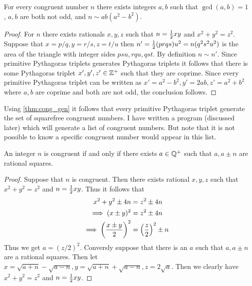 \begin{theorem}\label{thm:cong_gen}
  For every congruent number $n$ there exists integers $a,b$ such that $\gcd(a,b) = 1$, $a,b$ are both not odd, and $n \sim ab(a^2-b^2)$. 
\end{theorem}
\begin{proof}
  For $n$ there exists rationals $x,y,z$ such that $n = \frac{1}{2}xy$ and $x^2 + y^2 = z^2$. Suppose that $x = p/q, y = r/s, z = t/u$ then $n' = \frac{1}{2}(prqs)u^2 = n(q^2s^2u^2)$ is the area of the triangle with integer sides $psu, rqu, qst$. By definition $n\sim n'$. Since primitive Pythagoras triplets generates Pythagoras triplets it follows that there is some Pythagoras triplet $x',y',z'\in \mathbb{Z}^+$ such that they are coprime. Since every primitive Pythagoras triplet can be written as $x' = a^2 - b^2, y' = 2ab, z' = a^2 + b^2$ where $a,b$ are coprime and both are not odd, the conclusion follows.
\end{proof}
\begin{remark}
Using \cref{thm:cong_gen} it follows that every primitive Pythagoras triplet generate the set of squarefree congruent numbers. I have written a program (discussed later) which will generate a list of congruent numbers. But note that it is not possible to know a specific congruent number would appear in this list.
\end{remark}
\begin{proposition}\label{pro:rational_sq}
  An integer $n$ is congruent if and only if there exists $a\in \mathbb{Q}^+$ such that $a, a \pm n$ are rational squares.
\end{proposition}
\begin{proof}
  Suppose that $n$ is congruent. Then there exists rational $x,y,z$ such that $x^2 +y^2 =z^2$ and $n = \frac{1}{2}xy$. Thus it follows that
  \begin{align}\label{eq:1.1}
    x^2 + y^2 \pm 4n &= z^2 \pm 4n \nonumber\\
    \implies (x\pm y)^2 &= z^2 \pm 4n \nonumber\\
    \implies \left(\frac{x\pm y}{2}\right)^2 &= \left(\frac{z}{2}\right)^2 \pm n
  \end{align}
  Thus we get $a = (z/2)^2$. Conversly suppose that there is an $a$ such that $a, a \pm n$ are a rational squares. Then let $x = \sqrt{a + n} - \sqrt{a - n}, y = \sqrt{a + n} + \sqrt{a -n}, z = 2\sqrt{a}$. Then we clearly have $x^2 + y^2 = z^2$ and $n = \frac{1}{2}xy$.
\end{proof}

